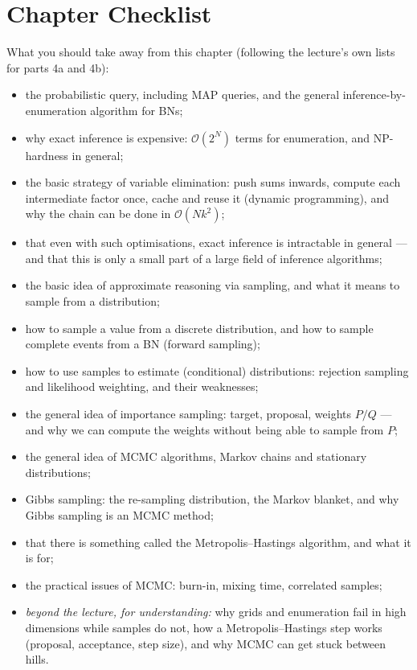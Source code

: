 \documentclass[11pt, oneside]{book}
\newcommand{\bigO}[1]{\mathcal{O}\!\left(#1\right)}
\let\originalsection\section
\renewcommand{\section}{\Needspace{7\baselineskip}\originalsection}
\begin{document}
\section{Chapter Checklist}

What you should take away from this chapter (following the lecture's own
lists for parts 4a and 4b):
\begin{itemize}
  \item the probabilistic query, including MAP queries, and the general
    inference-by-enumeration algorithm for BNs;
  \item why exact inference is expensive: $\mathcal{O}(2^N)$ terms for enumeration,
    and NP-hardness in general;
  \item the basic strategy of variable elimination: push sums inwards, compute
    each intermediate factor once, cache and reuse it (dynamic programming),
    and why the chain can be done in $\bigO{N k^2}$;
  \item that even with such optimisations, exact inference is intractable in
    general --- and that this is only a small part of a large field of
    inference algorithms;
  \item the basic idea of approximate reasoning via sampling, and what it means
    to sample from a distribution;
  \item how to sample a value from a discrete distribution, and how to sample
    complete events from a BN (forward sampling);
  \item how to use samples to estimate (conditional) distributions: rejection
    sampling and likelihood weighting, and their weaknesses;
  \item the general idea of importance sampling: target, proposal, weights
    $P/Q$ --- and why we can compute the weights without being able to sample
    from $P$;
  \item the general idea of MCMC algorithms, Markov chains and stationary
    distributions;
  \item Gibbs sampling: the re-sampling distribution, the Markov blanket, and
    why Gibbs sampling is an MCMC method;
  \item that there is something called the Metropolis--Hastings algorithm, and
    what it is for;
  \item the practical issues of MCMC: burn-in, mixing time, correlated
    samples;
  \item \emph{beyond the lecture, for understanding:} why grids and enumeration
    fail in high dimensions while samples do not, how a Metropolis--Hastings
    step works (proposal, acceptance, step size), and why MCMC can get stuck
    between hills.
\end{itemize}
\end{document}

